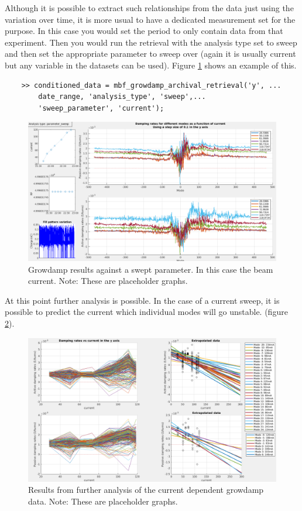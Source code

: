 \documentclass{report}
\begin{document}
Although it is possible to extract such relationships from the data just using the variation over time, it is more usual to have a dedicated measurement set for the purpose. In this case you would set the period to only contain data from that experiment. Then you would run the retrieval with the analysis type set to sweep and then set the appropriate parameter to sweep over (again it is usually current but any variable in the datasets can be used). Figure \ref{fig:growdamp_parameter_sweep} shows an example of this.
\begin{verbatim}
    >> conditioned_data = mbf_growdamp_archival_retrieval('y', ...
        date_range, 'analysis_type', 'sweep',...
        'sweep_parameter', 'current'); 
\end{verbatim}
\begin{figure}[ht]
    \centering
    \includegraphics[width=1\linewidth]{growdamp_parameter_sweep.png}
    \caption{Growdamp results against a swept parameter. In this case the beam current. Note: These are placeholder graphs.}
    \label{fig:growdamp_parameter_sweep}
\end{figure}
At this point further analysis is possible. In the case of a current sweep, it is possible to predict the current which individual modes will go unstable. (figure \ref{fig:growdamp_parameter_sweep_further_analysis}). 
\begin{figure}[ht]
    \centering
    \includegraphics[width=1\linewidth]{growdamp_parameter_sweep_further_analysis.png}
    \caption{Results from further analysis of the current dependent growdamp data. Note: These are placeholder graphs.}
    \label{fig:growdamp_parameter_sweep_further_analysis}
\end{figure}
\end{document}
